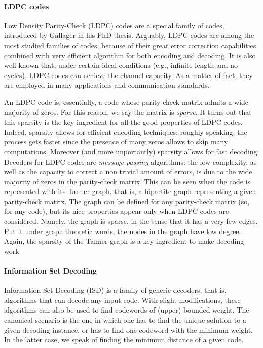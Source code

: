 \paragraph{LDPC codes} Low Density Parity-Check (LDPC) codes are a special family of codes, introduced by Gallager in his PhD thesis.
Arguably, LDPC codes are among the most studied families of codes, because of their great error correction capabilities combined with very efficient algorithm for both encoding and decoding.
It is also well known that, under certain ideal conditions (e.g., infinite length and no cycles), LDPC codes can achieve the channel capacity.
As a matter of fact, they are employed in many applications and communication standards.

An LDPC code is, essentially, a code whose parity-check matrix admits a wide majority of zeros.
For this reason, we say the matrix is \textit{sparse}.
It turns out that this sparsity is the key ingredient for all the good properties of LDPC codes.
Indeed, sparsity allows for efficient encoding techniques: roughly speaking, the process gets faster since the presence of many zeros allows to skip many computations.
Moreover (and more importantly) sparsity allows for fast decoding.
Decoders for LDPC codes are \textit{message-passing} algorithms: the low complexity, as well as the capacity to correct a non trivial amount of errors, is due to the wide majority of zeros in the parity-check matrix.
This can be seen when the code is represented with its Tanner graph, that is, a bipartite graph representing a given parity-check matrix.
The graph can be defined for any parity-check matrix (so, for any code), but its nice properties appear only when LDPC codes are considered.
Namely, the graph is sparse, in the sense that it has a very few edges.
Put it under graph theoretic words, the nodes in the graph have low degree.
Again, the sparsity of the Tanner graph is a key ingredient to make decoding work.


\paragraph{Information Set Decoding}
Information Set Decoding (ISD) is a family of generic decoders, that is, algorithms that can decode any input code.
With slight modifications, these algorithms can also be used to find codewords of (upper) bounded weight.
The canonical scenario is the one in which one has to find the unique solution to a given decoding instance, or has to find one codeword with the minimum weight.
In the latter case, we speak of finding the minimum distance of a given code.

